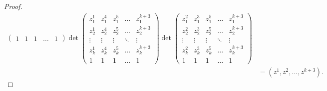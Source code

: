 \documentclass[10pt,a4paper]{amsart}
\begin{document}
\begin{proof}
\begin{align*}
{\begin{pmatrix}
    1 & 1 & 1 & \dots & 1
\end{pmatrix}}
{\det \begin{pmatrix}
    z_1^1 & z_1^4 & z_1^5 & \dots  & z_1^{k+3} \\
    z_2^1 & z_2^4 & z_2^5 & \dots  & z_2^{k+3} \\
    \vdots & \vdots & \vdots & \ddots & \vdots \\
    z_{k}^1 & z_{k}^4 & z_{k}^5 & \dots  &  z_{k}^{k+3} \\
    1 & 1 & 1 & \dots & 1
\end{pmatrix}\det \begin{pmatrix}
    z_1^2 & z_1^3 & z_1^5 & \dots  & z_1^{k+3} \\
    z_2^2 & z_2^3 & z_2^5 & \dots  & z_2^{k+3} \\
    \vdots & \vdots & \vdots & \ddots & \vdots \\
    z_{k}^2 & z_{k}^3 & z_{k}^5 & \dots  &  z_{k}^{k+3} \\
    1 & 1 & 1 & \dots & 1
\end{pmatrix}}\\
&=(z^1, z^2,..., z^{k+3}).
\end{align*}
\end{proof}
\end{document}
